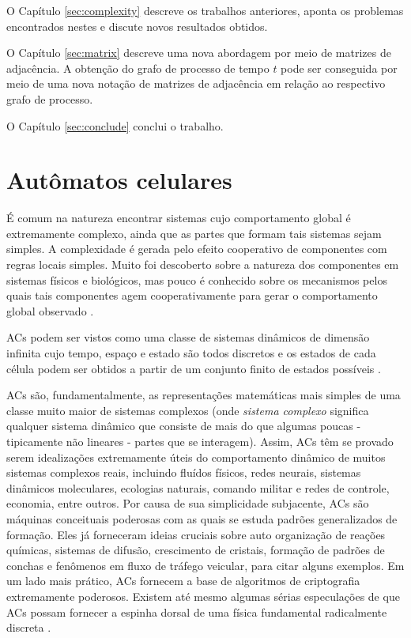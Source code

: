 \documentclass[12pt,a4paper]{article}
\begin{document}
O Capítulo \ref{sec:complexity} descreve os trabalhos anteriores, aponta
os problemas encontrados nestes e discute novos resultados obtidos.

O Capítulo \ref{sec:matrix} descreve uma nova abordagem por meio de matrizes
de adjacência. A obtenção do
grafo de processo de tempo $t$ pode ser conseguida por meio de uma nova notação de 
matrizes de adjacência em relação ao respectivo grafo de processo.

O Capítulo \ref{sec:conclude} conclui o trabalho.

\newpage

\section{Autômatos celulares}\label{sec:refteo}

É comum na natureza encontrar sistemas cujo comportamento global é extremamente
complexo, ainda que as partes que formam tais sistemas sejam simples. A
complexidade é gerada pelo efeito cooperativo de componentes com regras locais
simples. Muito foi descoberto sobre a natureza dos componentes em sistemas físicos
e biológicos, mas pouco é conhecido sobre os mecanismos pelos quais tais componentes
agem cooperativamente para gerar o comportamento global observado .

ACs podem ser vistos como uma classe de sistemas dinâmicos de dimensão
infinita cujo tempo, espaço e estado são todos discretos e os estados de cada célula
podem ser obtidos a partir de um conjunto finito de estados possíveis . 

ACs são, fundamentalmente, as representações matemáticas mais simples
de uma classe muito maior de sistemas complexos (onde \textit{sistema complexo} significa
qualquer sistema dinâmico que consiste de mais do que algumas poucas - tipicamente
não lineares - partes que se interagem). Assim, ACs têm se provado
serem idealizações extremamente úteis do comportamento dinâmico de muitos sistemas
complexos reais, incluindo fluídos físicos, redes neurais, sistemas dinâmicos
moleculares, ecologias naturais, comando militar e redes de controle, economia, entre
outros. Por causa de sua simplicidade subjacente, ACs são máquinas
conceituais poderosas com as quais se estuda padrões generalizados de formação. Eles
já forneceram ideias cruciais sobre auto organização de reações químicas, sistemas de
difusão, crescimento de cristais, formação de padrões de conchas e fenômenos em fluxo
de tráfego veicular, para citar alguns exemplos. Em um lado mais prático, ACs
fornecem a base de algoritmos de criptografia extremamente poderosos. Existem
até mesmo algumas sérias especulações de que ACs possam fornecer
a espinha dorsal de uma física fundamental radicalmente discreta .
\end{document}
